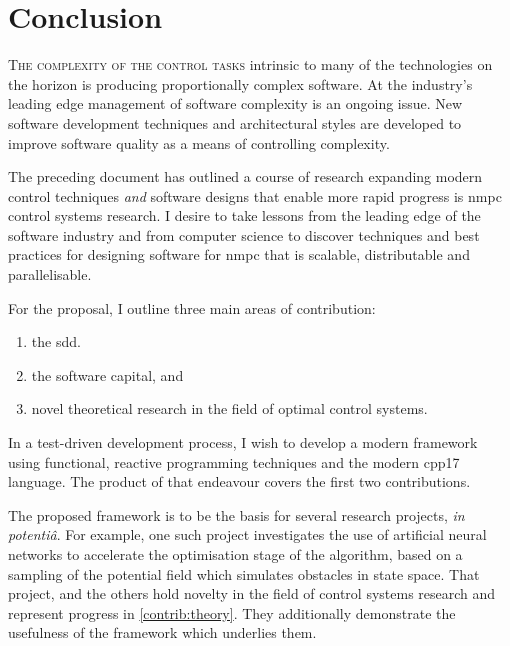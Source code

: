 %
\chapter{Conclusion}%
\label{chap:conclusion}

\textsc{The complexity of the control tasks} intrinsic to many of the
technologies on the horizon is producing proportionally complex software. At the
industry's leading edge management of software complexity is an ongoing issue.
New software development techniques and architectural styles are developed to
improve software quality as a means of controlling complexity.

The preceding document has outlined a course of research expanding modern
control techniques \emph{and} software designs that enable more rapid progress
is \ac{nmpc} control systems research. I desire to take lessons from the leading
edge of the software industry and from computer science to discover techniques
and best practices for designing software for \ac{nmpc} that is scalable,
distributable and parallelisable.

For the proposal, I outline three main areas of contribution:
\begin{enumerate}[label=(C\arabic*)]
  \item the \acl{sdd}.
  \item the software capital, and
  \item novel theoretical research in the field of optimal control
  systems.
\end{enumerate}

In a test-driven development process, I wish to develop a modern framework using
functional, reactive programming techniques and the modern \ac{cpp17} language.
The product of that endeavour covers the first two contributions.

The proposed framework is to be the basis for several research projects,
\textit{in potentiâ}. For example, one such project investigates the use of
artificial neural networks to accelerate the optimisation stage of the
algorithm, based on a sampling of the potential field which simulates obstacles
in state space. That project, and the others hold novelty in the field of
control systems research and represent progress in \ref{contrib:theory}. They
additionally demonstrate the usefulness of the framework which underlies them.
